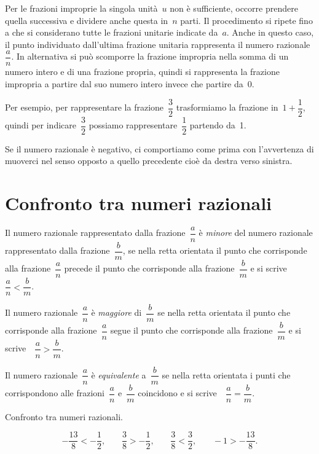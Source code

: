 Per le frazioni improprie la singola unità~$u$ non è sufficiente, occorre prendere quella successiva e
dividere anche questa in~$n$ parti. Il procedimento si ripete fino a che si considerano tutte
le frazioni unitarie indicate da~$a$. Anche in questo caso, il punto individuato dall'ultima frazione unitaria
rappresenta il numero razionale~$\dfrac{a}{n}$. In alternativa si può scomporre la frazione impropria
nella somma di un numero intero e di una frazione propria, quindi si rappresenta la frazione impropria
a partire dal suo numero intero invece che partire da~0.

Per esempio, per rappresentare la frazione~$\dfrac{3}{2}$
trasformiamo la frazione in~$1+\dfrac{1}{2}$, quindi per indicare~$\dfrac{3}{2}$ possiamo rappresentare~$\dfrac{1}{2}$ partendo da~1.

Se il numero razionale è negativo, ci comportiamo come prima con l'avvertenza di muoverci nel senso opposto a quello precedente cioè da destra verso sinistra.

\begin{center}

\end{center}

\ovalbox{\risolvii \ref{ese:3.33}, \ref{ese:3.34}, \ref{ese:3.35}}

\section{Confronto tra numeri razionali}

Il numero razionale rappresentato dalla frazione~$\dfrac{a}{n}$ è \emph{minore} del numero razionale
rappresentato dalla frazione~$\dfrac{b}{m}$, se nella retta orientata il punto che corrisponde alla
frazione~$\dfrac{a}{n}$ precede il punto che corrisponde alla frazione~$\dfrac{b}{m}$ e si scrive\ \  $\dfrac{a}{n}<\dfrac{b}{m}$.

Il numero razionale~$\dfrac{a}{n}$ è \emph{maggiore} di~$\dfrac{b}{m}$
se nella retta orientata il punto che corrisponde alla frazione~$\dfrac{a}{n}$ segue il punto che corrisponde alla frazione~$\dfrac{b}{m}$ e si scrive\ \ $\dfrac{a}{n}>\dfrac{b}{m}$.

Il numero razionale~$\dfrac{a}{n}$ è \emph{equivalente} a~$\dfrac{b}{m}$ se nella retta orientata i punti che corrispondono alle frazioni~$\dfrac{a}{n}$ e~$\dfrac{b}{m}$ coincidono e si scrive\ \ $\dfrac{a}{n} = \dfrac{b}{m}$.

\begin{exrig}
\begin{esempio}
Confronto tra numeri razionali.
\begin{center}

\end{center}
\[-\frac{13}{8}<-\frac{1}{2}\text{,}\qquad\frac{3}{8}>-\frac{1}{2}\text{,}\qquad\frac{3}{8}<\frac{3}{2}\text{,}\qquad-1>-\frac{13}{8}.\]
\end{esempio}
\end{exrig}

